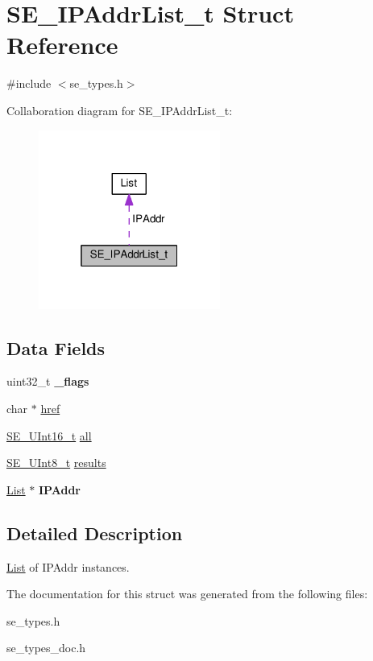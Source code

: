 \hypertarget{structSE__IPAddrList__t}{}\section{S\+E\+\_\+\+I\+P\+Addr\+List\+\_\+t Struct Reference}
\label{structSE__IPAddrList__t}


{\ttfamily \#include $<$se\+\_\+types.\+h$>$}



Collaboration diagram for S\+E\+\_\+\+I\+P\+Addr\+List\+\_\+t\+:\nopagebreak
\begin{figure}[H]
\begin{center}
\leavevmode
\includegraphics[width=169pt]{structSE__IPAddrList__t__coll__graph}
\end{center}
\end{figure}
\subsection*{Data Fields}
\begin{DoxyCompactItemize}
\item 
uint32\+\_\+t {\bfseries \+\_\+flags}
\item 
char $\ast$ \hyperlink{group__IPAddrList_ga4c7cdf66f95fb3279369ecfe722484ac}{href}
\item 
\hyperlink{group__UInt16_gac68d541f189538bfd30cfaa712d20d29}{S\+E\+\_\+\+U\+Int16\+\_\+t} \hyperlink{group__IPAddrList_gae540628e2b65249a48eac12cfc45ee6e}{all}
\item 
\hyperlink{group__UInt8_gaf7c365a1acfe204e3a67c16ed44572f5}{S\+E\+\_\+\+U\+Int8\+\_\+t} \hyperlink{group__IPAddrList_ga494d254730f745fc2e82ea322a4fd81f}{results}
\item 
\hyperlink{structList}{List} $\ast$ {\bfseries I\+P\+Addr}
\end{DoxyCompactItemize}


\subsection{Detailed Description}
\hyperlink{structList}{List} of I\+P\+Addr instances. 

The documentation for this struct was generated from the following files\+:\begin{DoxyCompactItemize}
\item 
se\+\_\+types.\+h\item 
se\+\_\+types\+\_\+doc.\+h\end{DoxyCompactItemize}
